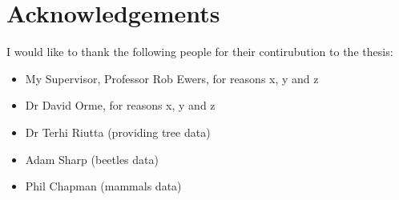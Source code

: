 \clearpage


\section*{Acknowledgements}

I would like to thank the following people for their contirubution to the thesis:

\begin{itemize}
 \item My Supervisor, Professor Rob Ewers, for reasons x, y and z
 \vspace*{3mm}
 \item Dr David Orme, for reasons x, y and z
 \vspace*{3mm}
 \item Dr Terhi Riutta (providing tree data)
 \vspace*{3mm}
 \item Adam Sharp (beetles data)
 \vspace*{3mm}
 \item Phil Chapman (mammals data)
\end{itemize}